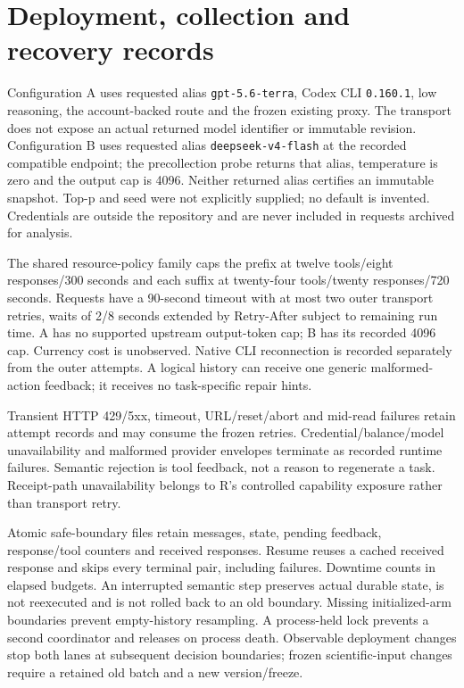\documentclass[11pt,a4paper]{article}
\newcommand{\code}[1]{\nolinkurl{#1}}
\begin{document}
\section{Deployment, collection and recovery records}
\label{app:phase2-engineering}
Configuration A uses requested alias \code{gpt-5.6-terra}, Codex CLI \code{0.160.1}, low reasoning, the account-backed route and the frozen existing proxy. The transport does not expose an actual returned model identifier or immutable revision. Configuration B uses requested alias \code{deepseek-v4-flash} at the recorded compatible endpoint; the precollection probe returns that alias, temperature is zero and the output cap is 4096. Neither returned alias certifies an immutable snapshot. Top-p and seed were not explicitly supplied; no default is invented. Credentials are outside the repository and are never included in requests archived for analysis.

The shared resource-policy family caps the prefix at twelve tools/eight responses/300 seconds and each suffix at twenty-four tools/twenty responses/720 seconds. Requests have a 90-second timeout with at most two outer transport retries, waits of 2/8 seconds extended by Retry-After subject to remaining run time. A has no supported upstream output-token cap; B has its recorded 4096 cap. Currency cost is unobserved. Native CLI reconnection is recorded separately from the outer attempts. A logical history can receive one generic malformed-action feedback; it receives no task-specific repair hints.

Transient HTTP 429/5xx, timeout, URL/reset/abort and mid-read failures retain attempt records and may consume the frozen retries. Credential/balance/model unavailability and malformed provider envelopes terminate as recorded runtime failures. Semantic rejection is tool feedback, not a reason to regenerate a task. Receipt-path unavailability belongs to R's controlled capability exposure rather than transport retry.

Atomic safe-boundary files retain messages, state, pending feedback, response/tool counters and received responses. Resume reuses a cached received response and skips every terminal pair, including failures. Downtime counts in elapsed budgets. An interrupted semantic step preserves actual durable state, is not reexecuted and is not rolled back to an old boundary. Missing initialized-arm boundaries prevent empty-history resampling. A process-held lock prevents a second coordinator and releases on process death. Observable deployment changes stop both lanes at subsequent decision boundaries; frozen scientific-input changes require a retained old batch and a new version/freeze.
\end{document}
